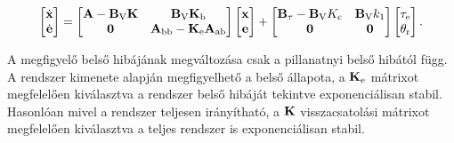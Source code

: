 \begin{align}
    \begin{bmatrix}
        \dot{\mathbf{x}} \\
        \dot{\mathbf{e}}
    \end{bmatrix}
    =
    \begin{bmatrix}
        \mathbf{A} - \mathbf{B}_{\mathrm{V}} \mathbf{K} & \mathbf{B}_{\mathrm{V}} \mathbf{K}_{\mathrm{b}} \\
        \mathbf{0} & \mathbf{A}_{\mathrm{bb}} - \mathbf{K}_{\mathrm{e}} \mathbf{A}_{\mathrm{ab}}
    \end{bmatrix}
    \begin{bmatrix}
        \mathbf{x} \\
        \mathbf{e}
    \end{bmatrix}
    +
    \begin{bmatrix}
        \mathbf{B}_{\mathrm{\tau}} - \mathbf{B}_{\mathrm{V}} K_{\mathrm{c}} & \mathbf{B}_{\mathrm{V}} k_1\\
        \mathbf{0} & \mathbf{0}
    \end{bmatrix}
    \begin{bmatrix}
        \tau_{\mathrm{e}} \\
        \theta_{\mathrm{r}}
    \end{bmatrix}.
\end{align}

A megfigyelő belső hibájának megváltozása csak a pillanatnyi belső hibától függ. A rendszer 
kimenete alapján megfigyelhető a belső állapota, a \(\mathbf{K}_{\mathrm{e}}\) mátrixot megfelelően kiválasztva
a rendszer belső hibáját tekintve exponenciálisan stabil. Hasonlóan mivel a rendszer teljesen irányítható,
a \(\mathbf{K}\) visszacsatolási mátrixot megfelelően kiválasztva a teljes rendszer is exponenciálisan stabil.

